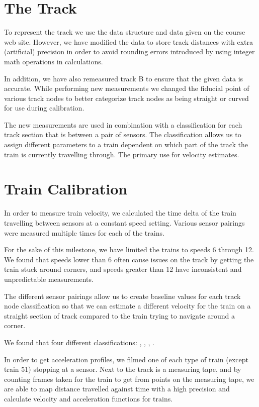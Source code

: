 \documentclass[pdftex,10pt,a4paper]{article}
\begin{document}
\section*{The Track}

To represent the track we use the data structure and data given on the
course web site. However, we have modified the data to store track
distances with extra (artificial) precision in order to avoid rounding
errors introduced by using integer math operations in calculations.

In addition, we have also remeasured track B to ensure that the given
data is accurate. While performing new measurements we changed the fiducial
point of various track nodes to better categorize track nodes as being
straight or curved for use during calibration.

The new measurements are used in combination with a classification for each
track section that is between a pair of sensors. The classification
allows us to assign different parameters to a train dependent on which
part of the track the train is currently travelling through. The
primary use for velocity estimates.

\section*{Train Calibration}

In order to measure train velocity, we calculated the time delta of
the train travelling between sensors at a constant speed
setting. Various sensor pairings were measured multiple times for each
of the trains.

For the sake of this milestone, we have limited the trains to speeds 6
through 12. We found that speeds lower than 6 often cause issues on
the track by getting the train stuck around corners, and speeds
greater than 12 have inconsistent and unpredictable measurements.

The different sensor pairings allow us to create baseline values for
each track node classification so that we can estimate a different
velocity for the train on a straight section of track compared to the
train trying to navigate around a corner.

We found that four different classifications: ,
, , .

In order to get acceleration profiles, we filmed one of each type of
train (except train 51) stopping at a sensor. Next to the track is a
measuring tape, and by counting frames taken for the train to get from
points on the measuring tape, we are able to map distance travelled
against time with a high precision and calculate velocity and
acceleration functions for trains.
\end{document}
